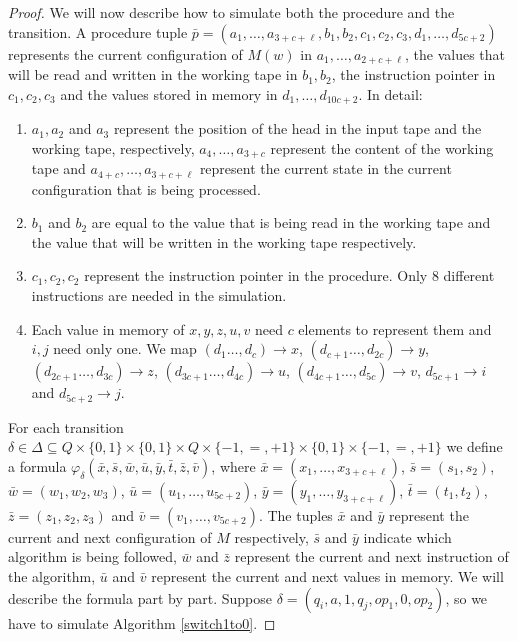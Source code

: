 \begin{proof}
	We will now describe how to simulate both the procedure and the transition. A procedure tuple $\bar{p} = (a_1,\ldots,a_{3+c+\ell},b_1,b_2,c_1,c_2,c_3,d_1,\ldots,d_{5c+2})$ represents the current configuration of $M(w)$ in $a_1,\ldots,a_{2+c+\ell}$, the values that will be read and written in the working tape in $b_1,b_2$, the instruction pointer in $c_1,c_2,c_3$ and the values stored in memory in $d_1,\ldots,d_{10c+2}$. In detail:
	\begin{enumerate}
		\item $a_1,a_2$ and $a_3$ represent the position of the head in the input tape and the working tape, respectively, $a_4,\ldots,a_{3+c}$ represent the content of the working tape and $a_{4+c},\ldots,a_{3+c+\ell}$ represent the current state in the current configuration that is being processed.
		\item $b_1$ and $b_2$ are equal to the value that is being read in the working tape and the value that will be written in the working tape respectively.
		\item $c_1,c_2,c_2$ represent the instruction pointer in the procedure. Only 8 different instructions are needed in the simulation.
		\item Each value in memory of $x,y,z,u,v$ need $c$ elements to represent them and $i,j$ need only one. We map $(d_1\ldots,d_{c}) \to x$, $(d_{c+1}\ldots,d_{2c}) \to y$,
		$(d_{2c+1}\ldots,d_{3c}) \to z$, $(d_{3c+1}\ldots,d_{4c}) \to u$,
		$(d_{4c+1}\ldots,d_{5c}) \to v$, $d_{5c+1} \to i$ and $d_{5c+2}\to j$.
	\end{enumerate}
	For each transition $\delta \in \Delta \subseteq Q \times \{0,1\} \times \{0,1\} \times Q \times \{-1,=,+1\} \times \{0,1\} \times \{-1,=,+1\}$ we define a formula $\varphi_{\delta}(\bar{x},\bar{s},\bar{w},\bar{u},\bar{y},\bar{t},\bar{z},\bar{v})$, where $\bar{x} = (x_1,\ldots,x_{3+c+\ell})$, $\bar{s} = (s_1,s_2)$, $\bar{w} = (w_1,w_2,w_3)$, $\bar{u} = (u_1,\ldots,u_{5c+2})$, $\bar{y} = (y_1,\ldots,y_{3+c+\ell})$, $\bar{t} = (t_1,t_2)$, $\bar{z} = (z_1,z_2,z_3)$ and $\bar{v} = (v_1,\ldots,v_{5c+2})$. The tuples $\bar{x}$ and $\bar{y}$ represent the current and next configuration of $M$ respectively, $\bar{s}$ and $\bar{y}$ indicate which algorithm is being followed, $\bar{w}$ and $\bar{z}$ represent the current and next instruction of the algorithm, $\bar{u}$ and $\bar{v}$ represent the current and next values in memory. We will describe the formula part by part. Suppose $\delta = (q_i,a,1,q_j,op_1,0,op_2)$, so we have to simulate Algorithm \ref{switch1to0}.
	

\end{proof}
